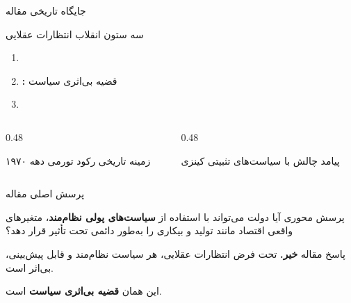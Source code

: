 \documentclass[aspectratio=169,11pt]{beamer}
\newcommand{\highlight}[1]{\textcolor{AccentOrange}{\textbf{#1}}}
\newcommand{\important}[1]{\textcolor{AlertRed}{\textbf{#1}}}
\begin{document}
\begin{frame}{جایگاه تاریخی مقاله}
	\begin{block}{سه ستون انقلاب انتظارات عقلایی}
		\begin{enumerate}
			\item {}
			\item \highlight{:} قضیه بی‌اثری سیاست
			\item {}
		\end{enumerate}
	\end{block}
	\vspace{0.4cm}
	\begin{LTR}
		\begin{columns}[T]
			\begin{column}{0.48\textwidth}
				\begin{RTL}
					\begin{alertblock}{زمینه تاریخی}
						\centering
						رکود تورمی دهه ۱۹۷۰
					\end{alertblock}
				\end{RTL}
			\end{column}
			\hfill
			\begin{column}{0.48\textwidth}
				\begin{RTL}
					\begin{exampleblock}{پیامد}
						\centering
						چالش با سیاست‌های تثبیتی کینزی
					\end{exampleblock}
				\end{RTL}
			\end{column}
		\end{columns}
	\end{LTR}
\end{frame}

\begin{frame}{پرسش اصلی مقاله}
	\begin{block}{پرسش محوری}
		\centering
		\large
		آیا دولت می‌تواند با استفاده از \highlight{سیاست‌های پولی نظام‌مند}، متغیرهای واقعی اقتصاد مانند تولید و بیکاری را به‌طور دائمی تحت تأثیر قرار دهد؟
	\end{block}
	\vspace{0.5cm}
	\begin{alertblock}{پاسخ مقاله}
		\centering
		\large
		\important{خیر.} تحت فرض انتظارات عقلایی، هر سیاست نظام‌مند و قابل پیش‌بینی، بی‌اثر است.
		\vspace{0.2cm}

		این همان \important{قضیه بی‌اثری سیاست} است.
	\end{alertblock}
\end{frame}
\end{document}
